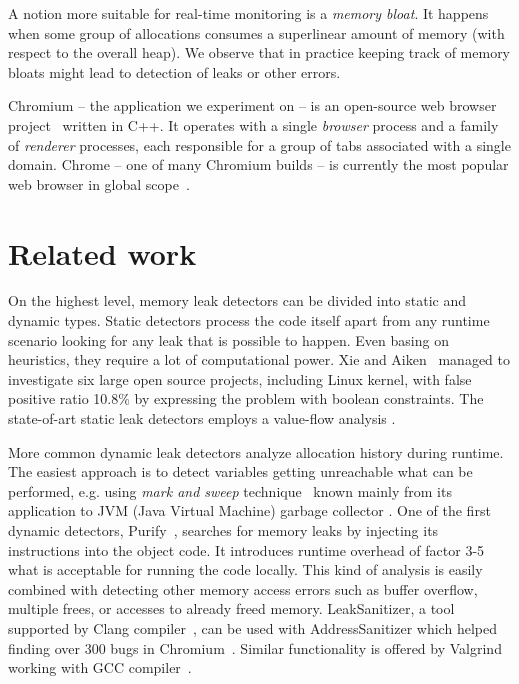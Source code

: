 \documentclass[preprint, numbers]{sigplanconf}
\newcommand{\todo}[1]{{\color{red}{(TODO: #1)}}}
\begin{document}
A notion more suitable for real-time monitoring is a \textit{memory bloat}.
It happens when some group of allocations consumes a superlinear amount of memory
(with respect to the overall heap).
We observe that in practice keeping track of memory bloats might lead to detection
of leaks or other errors.

Chromium -- the application we experiment on -- is an open-source web browser project~\cite{chromium} written in C++.
It operates with a single \textit{browser} process and a family
of \textit{renderer} processes, each responsible for a group
of tabs associated with a single domain.
Chrome -- one of many Chromium builds -- is currently the most popular web browser in global scope~\cite{wikimedia}.

\section{Related work}

On the highest level, memory leak detectors can be divided into static
and dynamic types.
Static detectors process the code itself apart from any runtime scenario
looking for any leak that is possible to happen.
Even basing on heuristics, they require a lot of computational power.
Xie and Aiken~\cite{boolean} managed to investigate six large open source
projects, including Linux kernel, with false positive ratio 10.8\%
by expressing the problem with boolean constraints.
The state-of-art static leak detectors employs a value-flow
analysis \cite{flow, saber}.

More common dynamic leak detectors analyze allocation history during runtime.
The easiest approach is to detect variables getting unreachable
what can be performed, e.g. using \textit{mark and sweep} technique~\cite{mark-and-sweep}
known mainly from its application to JVM (Java Virtual Machine) garbage collector \todo{cite}.
One of the first dynamic detectors, Purify~\cite{purify}, searches for memory leaks by injecting its instructions
into the object code.
It introduces runtime overhead of factor 3-5 what is acceptable for running
the code locally.
This kind of analysis is easily combined with detecting other memory access errors
such as buffer overflow, multiple frees, or accesses to already freed memory.
LeakSanitizer, a tool supported by Clang compiler~\cite{leak-san}, can be used with AddressSanitizer
which helped finding over 300 bugs in Chromium~\cite{address}.
Similar functionality is offered by Valgrind working with GCC compiler~\cite{valgrind}.
\end{document}
